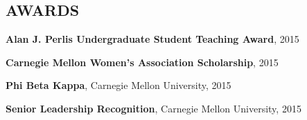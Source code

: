 \documentclass[margin, 11pt]{res} %
\begin{document}
\begin{resume}





\section{AWARDS}

{\bf Alan J. Perlis Undergraduate Student Teaching Award}, 2015

\vspace{4pt}

{\bf Carnegie Mellon Women's Association Scholarship}, 2015

\vspace{4pt}

{\bf Phi Beta Kappa}, Carnegie Mellon University, 2015

\vspace{4pt}

{\bf Senior Leadership Recognition}, Carnegie Mellon University, 2015

\vspace{4pt}





\end{resume}
\end{document}
